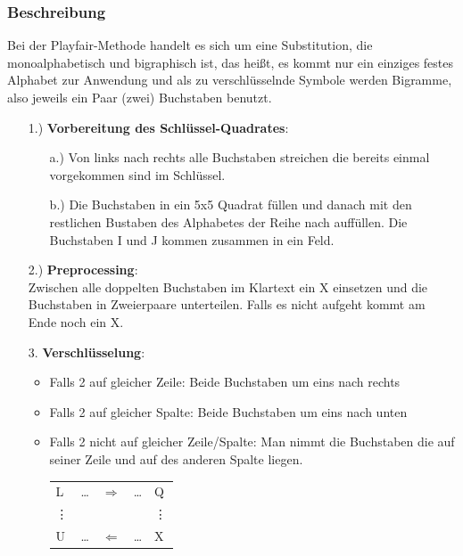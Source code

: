 \documentclass[10pt]{article}
\newcommand{\Ra}{\Rightarrow}
\newcommand{\La}{\Leftarrow}
\begin{document}
\subsubsection{Beschreibung}
Bei der Playfair-Methode handelt es sich um eine Substitution, die monoalphabetisch und bigraphisch ist, das heißt, es kommt nur ein einziges  festes Alphabet zur Anwendung und als zu verschlüsselnde Symbole werden Bigramme, also jeweils ein Paar (zwei) Buchstaben benutzt.
\begin{itemize}
	\item[1.)] \textbf{Vorbereitung des Schlüssel-Quadrates}:
		\begin{itemize}
			\item[a.)] Von links nach rechts alle Buchstaben streichen die bereits einmal vorgekommen sind im Schlüssel.
			\item[b.)] Die Buchstaben in ein 5x5 Quadrat füllen und danach mit den restlichen Bustaben des Alphabetes der Reihe nach auffüllen. Die Buchstaben I und J kommen zusammen in ein Feld.
		\end{itemize}
	\item[2.)] \textbf{Preprocessing}: \\
		Zwischen alle doppelten Buchstaben im Klartext ein X einsetzen und die Buchstaben in Zweierpaare unterteilen. Falls es nicht aufgeht kommt am Ende noch ein X.
	\item[3.] \textbf{Verschlüsselung}:
		\begin{itemize}
 			\item Falls 2 auf gleicher Zeile: Beide Buchstaben um eins nach rechts
			\item Falls 2 auf gleicher Spalte: Beide Buchstaben um eins nach unten
			\item Falls 2 nicht auf gleicher Zeile/Spalte: Man nimmt die Buchstaben die auf seiner Zeile und auf des anderen Spalte liegen.\\
				\begin{tabular}{lllll}
  					L&\dots&$\Ra$&\dots&Q\\
					\vdots &&&&\vdots\\
  					U&\dots&$\La$&\dots&X\\
				\end{tabular}
		\end{itemize}
\end{itemize}
\end{document}

